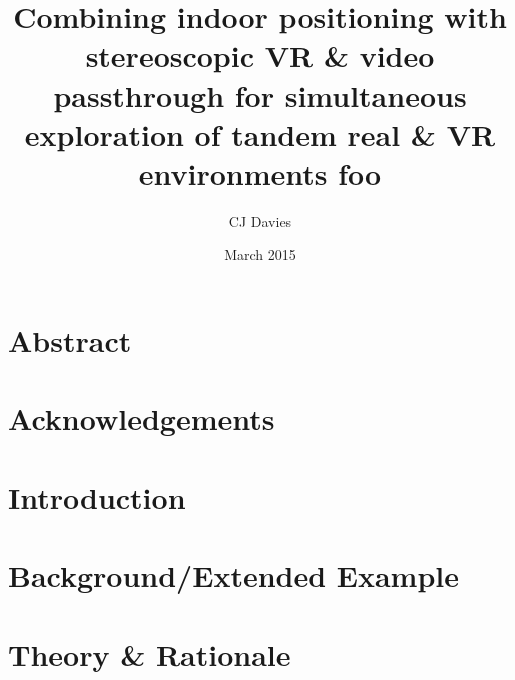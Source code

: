 \documentclass{report}
\begin{document}

\title{Combining indoor positioning with stereoscopic VR \& video passthrough for simultaneous exploration of tandem real \& VR environments foo}
\date{March 2015}
\author{CJ Davies}
\maketitle


\chapter*{Abstract}



\chapter*{Acknowledgements}



\tableofcontents


\chapter{Introduction}



\chapter{Background/Extended Example}



\chapter{Theory \& Rationale}

\graphicspath{ {03/images/} }

\end{document}
